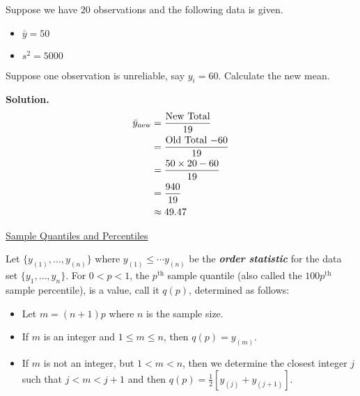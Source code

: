 \begin{exbox}
    \begin{example}
        Suppose we have $ 20 $ observations and the following data is given.
        \begin{itemize}
            \item $ \bar{y}=50 $
            \item $ s^2=5000 $
        \end{itemize}
        Suppose one observation is unreliable, say $ y_i=60 $. Calculate
        the new mean.
        
        \textbf{Solution.}
        \begin{align*}
            \bar{y}_{\text{new}}
             & =\frac{\text{New Total}}{19}          \\
             & =\frac{\text{Old Total $ - 60 $}}{19} \\
             & =\frac{50\times 20-60}{19}            \\
             & =\frac{940}{19}                       \\
             & \approx 49.47
        \end{align*}
    \end{example}
\end{exbox}

\underline{Sample Quantiles and Percentiles}
\begin{defbox}
    \begin{definition}
        Let $ \{y_{(1)},\ldots ,y_{(n)}\} $ where $ y_{(1)}\leqslant \cdots y_{(n)} $
        be the \textbf{\emph{order statistic}} for the data set $ \{y_1,\ldots ,y_n\} $.
        For $ 0<p<1 $, the $ p^{\text{th}} $ sample quantile (also called the $ 100p^{\text{th}} $
        sample percentile), is a value, call it $ q(p) $, determined as follows:
        \begin{itemize}
            \item Let $ m=(n+1)p $ where $ n $ is the sample size.
            \item If $ m $ is an integer and $ 1\leqslant m\leqslant n $, then $ q(p)=y_{(m)} $.
            \item If $ m $ is not an integer, but $ 1<m<n $, then we determine the closest integer $ j $ such
                  that $ j < m < j+1 $ and then $ q(p)=\frac{1}{2} \left[ y_{(j)}+y_{(j+1)} \right] $.
        \end{itemize}
    \end{definition}
\end{defbox}

